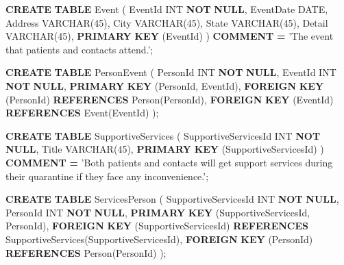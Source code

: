 \documentclass[
]{article}
\newenvironment{Shaded}{\begin{snugshade}}{\end{snugshade}}
\newcommand{\DataTypeTok}[1]{\textcolor[rgb]{0.13,0.29,0.53}{#1}}
\newcommand{\DecValTok}[1]{\textcolor[rgb]{0.00,0.00,0.81}{#1}}
\newcommand{\KeywordTok}[1]{\textcolor[rgb]{0.13,0.29,0.53}{\textbf{#1}}}
\newcommand{\NormalTok}[1]{#1}
\newcommand{\OperatorTok}[1]{\textcolor[rgb]{0.81,0.36,0.00}{\textbf{#1}}}
\newcommand{\StringTok}[1]{\textcolor[rgb]{0.31,0.60,0.02}{#1}}
\begin{document}
\begin{Shaded}
\begin{Highlighting}[]
\KeywordTok{CREATE} \KeywordTok{TABLE}\NormalTok{ Event (}
\NormalTok{  EventId }\DataTypeTok{INT} \KeywordTok{NOT} \KeywordTok{NULL}\NormalTok{,}
\NormalTok{  EventDate }\DataTypeTok{DATE}\NormalTok{,}
\NormalTok{  Address }\DataTypeTok{VARCHAR}\NormalTok{(}\DecValTok{45}\NormalTok{),}
\NormalTok{  City }\DataTypeTok{VARCHAR}\NormalTok{(}\DecValTok{45}\NormalTok{),}
\NormalTok{  State }\DataTypeTok{VARCHAR}\NormalTok{(}\DecValTok{45}\NormalTok{),}
\NormalTok{  Detail }\DataTypeTok{VARCHAR}\NormalTok{(}\DecValTok{45}\NormalTok{),}
  \KeywordTok{PRIMARY} \KeywordTok{KEY}\NormalTok{ (EventId)}
\NormalTok{)}
\KeywordTok{COMMENT} \OperatorTok{=} \StringTok{'The event that patients and contacts attend.'}\NormalTok{;}


\KeywordTok{CREATE} \KeywordTok{TABLE}\NormalTok{ PersonEvent (}
\NormalTok{  PersonId }\DataTypeTok{INT} \KeywordTok{NOT} \KeywordTok{NULL}\NormalTok{,}
\NormalTok{  EventId }\DataTypeTok{INT} \KeywordTok{NOT} \KeywordTok{NULL}\NormalTok{,}
  \KeywordTok{PRIMARY} \KeywordTok{KEY}\NormalTok{ (PersonId, EventId),}
  \KeywordTok{FOREIGN} \KeywordTok{KEY}\NormalTok{ (PersonId)}
    \KeywordTok{REFERENCES}\NormalTok{ Person(PersonId),}
  \KeywordTok{FOREIGN} \KeywordTok{KEY}\NormalTok{ (EventId)}
    \KeywordTok{REFERENCES}\NormalTok{ Event(EventId)}
\NormalTok{);}


\KeywordTok{CREATE} \KeywordTok{TABLE}\NormalTok{ SupportiveServices (}
\NormalTok{  SupportiveServicesId }\DataTypeTok{INT} \KeywordTok{NOT} \KeywordTok{NULL}\NormalTok{,}
\NormalTok{  Title }\DataTypeTok{VARCHAR}\NormalTok{(}\DecValTok{45}\NormalTok{),}
  \KeywordTok{PRIMARY} \KeywordTok{KEY}\NormalTok{ (SupportiveServicesId)}
\NormalTok{)}
\KeywordTok{COMMENT} \OperatorTok{=} \StringTok{'Both patients and contacts will get support services during their quarantine if they face any inconvenience.'}\NormalTok{;}


\KeywordTok{CREATE} \KeywordTok{TABLE}\NormalTok{ ServicesPerson (}
\NormalTok{  SupportiveServicesId }\DataTypeTok{INT} \KeywordTok{NOT} \KeywordTok{NULL}\NormalTok{,}
\NormalTok{  PersonId }\DataTypeTok{INT} \KeywordTok{NOT} \KeywordTok{NULL}\NormalTok{,}
  \KeywordTok{PRIMARY} \KeywordTok{KEY}\NormalTok{ (SupportiveServicesId, PersonId),}
  \KeywordTok{FOREIGN} \KeywordTok{KEY}\NormalTok{ (SupportiveServicesId)}
    \KeywordTok{REFERENCES}\NormalTok{ SupportiveServices(SupportiveServicesId),}
  \KeywordTok{FOREIGN} \KeywordTok{KEY}\NormalTok{ (PersonId)}
    \KeywordTok{REFERENCES}\NormalTok{ Person(PersonId)}
\NormalTok{);}



\end{Highlighting}
\end{Shaded}
\end{document}

